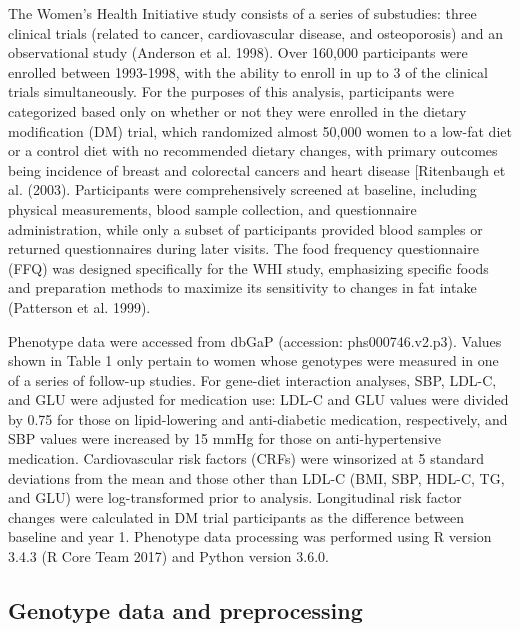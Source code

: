 \documentclass[]{article}
\begin{document}
The Women's Health Initiative study consists of a series of substudies:
three clinical trials (related to cancer, cardiovascular disease, and
osteoporosis) and an observational study (Anderson et al. 1998). Over
160,000 participants were enrolled between 1993-1998, with the ability
to enroll in up to 3 of the clinical trials simultaneously. For the
purposes of this analysis, participants were categorized based only on
whether or not they were enrolled in the dietary modification (DM)
trial, which randomized almost 50,000 women to a low-fat diet or a
control diet with no recommended dietary changes, with primary outcomes
being incidence of breast and colorectal cancers and heart disease
{[}Ritenbaugh et al. (2003). Participants were comprehensively screened
at baseline, including physical measurements, blood sample collection,
and questionnaire administration, while only a subset of participants
provided blood samples or returned questionnaires during later visits.
The food frequency questionnaire (FFQ) was designed specifically for the
WHI study, emphasizing specific foods and preparation methods to
maximize its sensitivity to changes in fat intake (Patterson et al.
1999).

Phenotype data were accessed from dbGaP (accession: phs000746.v2.p3).
Values shown in Table 1 only pertain to women whose genotypes were
measured in one of a series of follow-up studies. For gene-diet
interaction analyses, SBP, LDL-C, and GLU were adjusted for medication
use: LDL-C and GLU values were divided by 0.75 for those on
lipid-lowering and anti-diabetic medication, respectively, and SBP
values were increased by 15 mmHg for those on anti-hypertensive
medication. Cardiovascular risk factors (CRFs) were winsorized at 5
standard deviations from the mean and those other than LDL-C (BMI, SBP,
HDL-C, TG, and GLU) were log-transformed prior to analysis. Longitudinal
risk factor changes were calculated in DM trial participants as the
difference between baseline and year 1. Phenotype data processing was
performed using R version 3.4.3 (R Core Team 2017) and Python version
3.6.0.

\hypertarget{genotype-data-and-preprocessing}{%
\subsection{Genotype data and
preprocessing}\label{genotype-data-and-preprocessing}}
\end{document}
